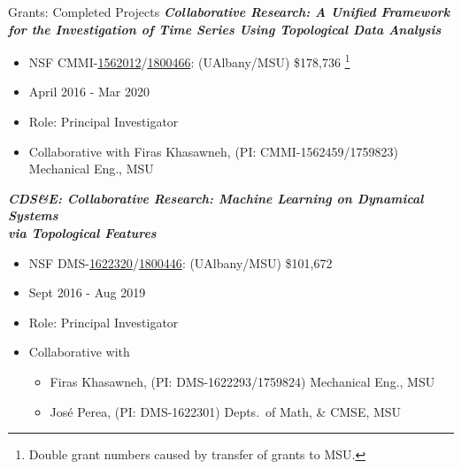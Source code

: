 \documentclass{resume} %
\begin{document}
\begin{rSection}{Grants: Completed Projects}
\textbf{\textit{Collaborative Research: A Unified Framework for the Investigation of Time Series Using Topological Data Analysis}}
\vspace{-.1in}
\begin{itemize}{}{\leftmargin=0em}
   \itemsep -0.6em %
   \item
NSF CMMI-\href{https://nsf.gov/awardsearch/showAward?AWD_ID=1562012}{1562012}/\href{https://nsf.gov/awardsearch/showAward?AWD_ID=1800466}{1800466}: (UAlbany/MSU)  \$178,736 \footnote{Double grant numbers caused by transfer of grants to MSU.}
\item
April 2016 - Mar 2020
   \item
Role: Principal Investigator
\item Collaborative with
  Firas Khasawneh, (PI: CMMI-1562459/1759823) Mechanical Eng., MSU

\end{itemize}


\textbf{\textit{CDS\&E: Collaborative Research: Machine Learning on Dynamical Systems\\ via Topological Features}}
\vspace{-.1in}
\begin{itemize}{}{\leftmargin=0em}
   \itemsep -0.6em %
   \item
NSF DMS-\href{https://nsf.gov/awardsearch/showAward?AWD_ID=1622320}{1622320}/\href{https://nsf.gov/awardsearch/showAward?AWD_ID=1800446}{1800446}: (UAlbany/MSU)  \$101,672
\item
Sept 2016 - Aug 2019
   \item
Role: Principal Investigator
\item Collaborative with
   \vspace{-.1in}
\begin{itemize}{}{\leftmargin=0em}
   \itemsep -0.6em %
   \item Firas Khasawneh, (PI: DMS-1622293/1759824) Mechanical Eng., MSU
   \item Jos\'e Perea, (PI: DMS-1622301) Depts.~of Math, \& CMSE, MSU
   \end{itemize}



\end{itemize}
\end{rSection}
\end{document}
